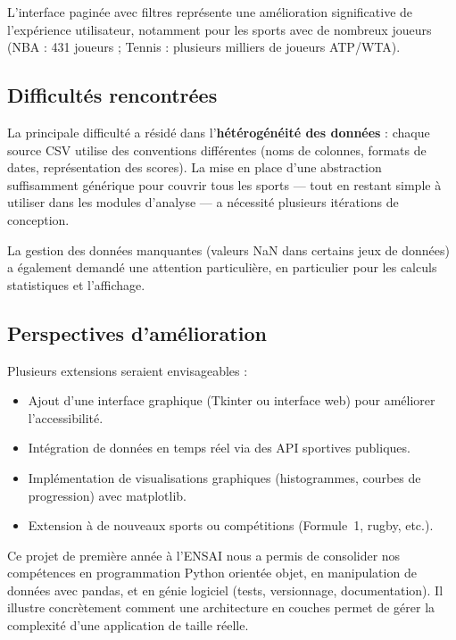 \documentclass[12pt,a4paper]{article}
\begin{document}
L'interface paginée avec filtres représente une amélioration significative de
l'expérience utilisateur, notamment pour les sports avec de nombreux joueurs
(NBA : 431 joueurs ; Tennis : plusieurs milliers de joueurs ATP/WTA).

\subsection{Difficultés rencontrées}

La principale difficulté a résidé dans l'\textbf{hétérogénéité des données} :
chaque source CSV utilise des conventions différentes (noms de colonnes, formats
de dates, représentation des scores). La mise en place d'une abstraction
suffisamment générique pour couvrir tous les sports --- tout en restant simple
à utiliser dans les modules d'analyse --- a nécessité plusieurs itérations
de conception.

La gestion des données manquantes (valeurs NaN dans certains jeux de données)
a également demandé une attention particulière, en particulier pour les calculs
statistiques et l'affichage.

\subsection{Perspectives d'amélioration}

Plusieurs extensions seraient envisageables :
\begin{itemize}
  \item Ajout d'une interface graphique (Tkinter ou interface web) pour
        améliorer l'accessibilité.
  \item Intégration de données en temps réel via des API sportives publiques.
  \item Implémentation de visualisations graphiques (histogrammes, courbes
        de progression) avec matplotlib.
  \item Extension à de nouveaux sports ou compétitions (Formule~1, rugby, etc.).
\end{itemize}

\bigskip

Ce projet de première année à l'ENSAI nous a permis de consolider nos
compétences en programmation Python orientée objet, en manipulation de données
avec pandas, et en génie logiciel (tests, versionnage, documentation). Il
illustre concrètement comment une architecture en couches permet de gérer la
complexité d'une application de taille réelle.
\end{document}

